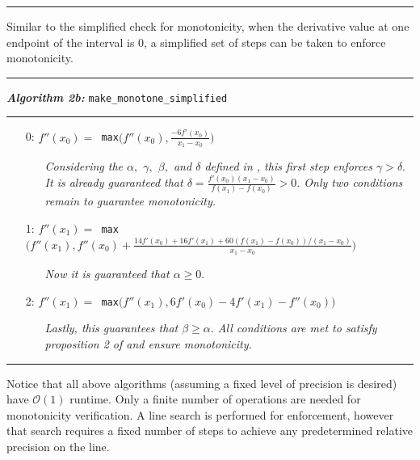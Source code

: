 \documentclass{scspaperproc}
\theoremstyle{scsthe}
\begin{document}
\hrule
\vspace{10pt}


Similar to the simplified check for monotonicity, when the derivative value at one endpoint of the interval is $0$, a simplified set of steps can be taken to enforce monotonicity.

\vspace{10pt}%
\hrule%
\vspace{3pt}%
\noindent\textbf{\textit{Algorithm 2b:}} \texttt{make\_monotone\_simplified}%
\vspace{3pt}%
\hrule%

\begin{itemize}
  \itemsep0pt
  \parskip0pt

\item[0:] $f''(x_0) = $\texttt{ max}$\bigg(f''(x_0), \frac{-6 f'(x_0)}{x_1 - x_0}\bigg)$

  \begin{itemize}
    \item[] \textit{Considering the $\alpha,$ $\gamma,$ $\beta,$ and $\delta$ defined in \cite{schmidt1988positivity}, this first step enforces $\gamma > \delta.$ It is already guaranteed that $\delta = \frac{f'(x_0)(x_1 - x_0)}{f(x_1) - f(x_0)} > 0.$ Only two conditions remain to guarantee monotonicity.}
  \end{itemize}

\item[1:] $f''(x_1) = $\texttt{ max}$\bigg( f''(x_1), f''(x_0) + \frac{14 f'(x_0) + 16 f'(x_1) + 60(f(x_1) - f(x_0)) / (x_1 - x_0)}{x_1 - x_0} \bigg)$

  \begin{itemize}
    \item[] \textit{Now it is guaranteed that $\alpha \geq 0.$}
  \end{itemize}

\item[2:] $f''(x_1) = $\texttt{ max}$\bigg( f''(x_1), 6 f'(x_0) - 4 f'(x_1) - f''(x_0) \bigg)$

  \begin{itemize}
    \item[] \textit{Lastly, this guarantees that $\beta \geq \alpha.$ All conditions are met to satisfy proposition 2 of \cite{schmidt1988positivity} and ensure monotonicity.}
  \end{itemize}
\end{itemize}
\hrule
\vspace{10pt}
Notice that all above algorithms (assuming a fixed level of precision is desired) have $\mathcal{O}(1)$ runtime. Only a finite number of operations are needed for monotonicity verification. A line search is performed for enforcement, however that search requires a fixed number of steps to achieve any predetermined relative precision on the line.
\end{document}
